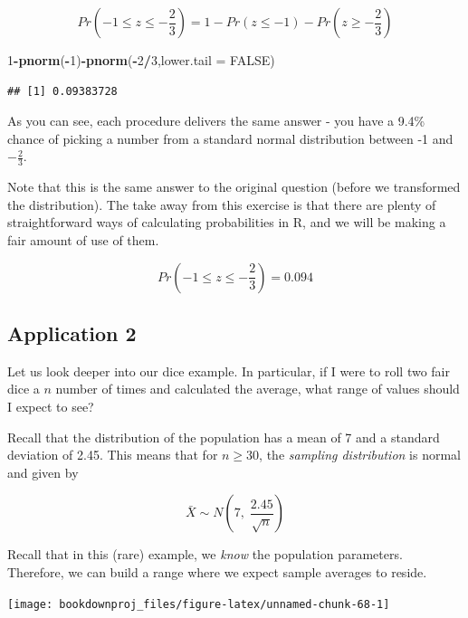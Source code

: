 \documentclass[
]{book}
\newenvironment{Shaded}{\begin{snugshade}}{\end{snugshade}}
\newcommand{\AttributeTok}[1]{\textcolor[rgb]{0.13,0.29,0.53}{#1}}
\newcommand{\ConstantTok}[1]{\textcolor[rgb]{0.56,0.35,0.01}{#1}}
\newcommand{\DecValTok}[1]{\textcolor[rgb]{0.00,0.00,0.81}{#1}}
\newcommand{\FunctionTok}[1]{\textcolor[rgb]{0.13,0.29,0.53}{\textbf{#1}}}
\newcommand{\NormalTok}[1]{#1}
\newcommand{\SpecialCharTok}[1]{\textcolor[rgb]{0.81,0.36,0.00}{\textbf{#1}}}
\begin{document}
\[Pr\left(-1 \leq z \leq -\frac{2}{3}\right)=1 - Pr(z \leq -1) - Pr\left(z \geq -\frac{2}{3}\right)\]

\begin{Shaded}
\begin{Highlighting}[]
\DecValTok{1}\SpecialCharTok{{-}}\FunctionTok{pnorm}\NormalTok{(}\SpecialCharTok{{-}}\DecValTok{1}\NormalTok{)}\SpecialCharTok{{-}}\FunctionTok{pnorm}\NormalTok{(}\SpecialCharTok{{-}}\DecValTok{2}\SpecialCharTok{/}\DecValTok{3}\NormalTok{,}\AttributeTok{lower.tail =} \ConstantTok{FALSE}\NormalTok{)}
\end{Highlighting}
\end{Shaded}

\begin{verbatim}
## [1] 0.09383728
\end{verbatim}

As you can see, each procedure delivers the same answer - you have a 9.4\% chance of picking a number from a standard normal distribution between -1 and \(-\frac{2}{3}\).

Note that this is the same answer to the original question (before we transformed the distribution). The take away from this exercise is that there are plenty of straightforward ways of calculating probabilities in R, and we will be making a fair amount of use of them.

\[Pr\left(-1 \leq z \leq -\frac{2}{3}\right)=0.094\]

\subsection{Application 2}\label{application-2}

Let us look deeper into our dice example. In particular, if I were to roll two fair dice a \(n\) number of times and calculated the average, what range of values should I expect to see?

Recall that the distribution of the population has a mean of 7 and a standard deviation of 2.45. This means that for \(n \geq 30\), the \emph{sampling distribution} is normal and given by

\[\bar{X} \sim N \left( 7, \; \frac{2.45}{\sqrt{n}} \right)\]

Recall that in this (rare) example, we \emph{know} the population parameters. Therefore, we can build a range where we expect sample averages to reside.

\begin{center}\texttt{[image: bookdownproj\_files/figure-latex/unnamed-chunk-68-1]} \end{center}
\end{document}
